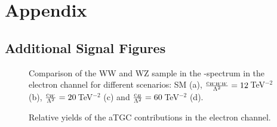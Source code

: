 

\chapter{Appendix}   
\label{chap:appendix}



\section{Additional Signal Figures}

\begin{figure}[h!]
	\centering
	\caption[Comparison of the WW and WZ sample in the \Mpr -spectrum in the electron channel]{Comparison of the WW and WZ sample in the \Mpr -spectrum in the electron channel for different scenarios: SM (a), $\frac{c_{WWW}}{\Lambda^2}=12$\,TeV$^{-2}$ (b), $\frac{c_{W}}{\Lambda^2}=20$\,TeV$^{-2}$ (c) and $\frac{c_{B}}{\Lambda^2}=60$\,TeV$^{-2}$ (d). }
	\label{fig:signal:wwwz_comp_el}
\end{figure}

\begin{figure}
	\centering
	\caption[Relative yields of the aTGC contributions in the electron channel]{Relative yields of the aTGC contributions in the electron channel.}
	\label{fig:app:atgcyields_el}
\end{figure}
		

